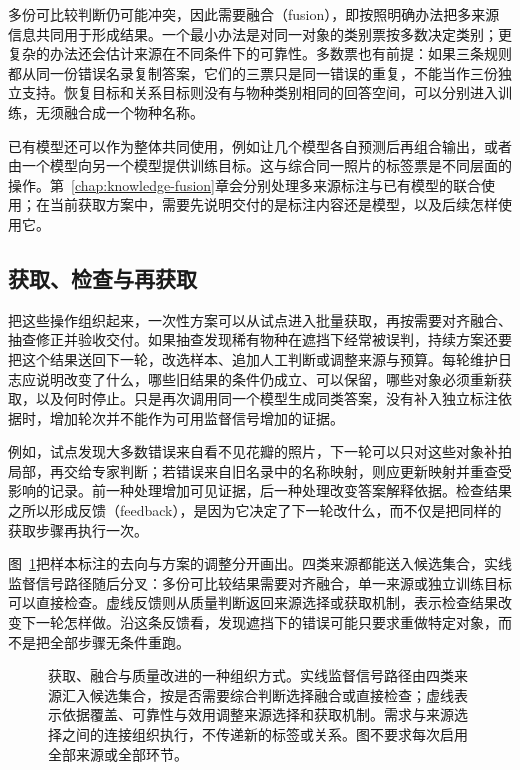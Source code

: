 多份可比较判断仍可能冲突，因此需要融合（fusion），即按照明确办法把多来源信息共同用于形成结果。一个最小办法是对同一对象的类别票按多数决定类别；更复杂的办法还会估计来源在不同条件下的可靠性。多数票也有前提：如果三条规则都从同一份错误名录复制答案，它们的三票只是同一错误的重复，不能当作三份独立支持。恢复目标和关系目标则没有与物种类别相同的回答空间，可以分别进入训练，无须融合成一个物种名称。

已有模型还可以作为整体共同使用，例如让几个模型各自预测后再组合输出，或者由一个模型向另一个模型提供训练目标。这与综合同一照片的标签票是不同层面的操作。第~\ref{chap:knowledge-fusion}章会分别处理多来源标注与已有模型的联合使用；在当前获取方案中，需要先说明交付的是标注内容还是模型，以及后续怎样使用它。

\subsection{获取、检查与再获取}
\label{sec:knowledge-acquisition-feedback}

把这些操作组织起来，一次性方案可以从试点进入批量获取，再按需要对齐融合、抽查修正并验收交付。如果抽查发现稀有物种在遮挡下经常被误判，持续方案还要把这个结果送回下一轮，改选样本、追加人工判断或调整来源与预算。每轮维护日志应说明改变了什么，哪些旧结果的条件仍成立、可以保留，哪些对象必须重新获取，以及何时停止。只是再次调用同一个模型生成同类答案，没有补入独立标注依据时，增加轮次并不能作为可用监督信号增加的证据。

例如，试点发现大多数错误来自看不见花瓣的照片，下一轮可以只对这些对象补拍局部，再交给专家判断；若错误来自旧名录中的名称映射，则应更新映射并重查受影响的记录。前一种处理增加可见证据，后一种处理改变答案解释依据。检查结果之所以形成反馈（feedback），是因为它决定了下一轮改什么，而不仅是把同样的获取步骤再执行一次。

图~\ref{fig:knowledge-acquisition-workflow}把样本标注的去向与方案的调整分开画出。四类来源都能送入候选集合，实线监督信号路径随后分叉：多份可比较结果需要对齐融合，单一来源或独立训练目标可以直接检查。虚线反馈则从质量判断返回来源选择或获取机制，表示检查结果改变下一轮怎样做。沿这条反馈看，发现遮挡下的错误可能只要求重做特定对象，而不是把全部步骤无条件重跑。

\begin{figure}[htbp]
  \centering
  
  \caption{获取、融合与质量改进的一种组织方式。实线监督信号路径由四类来源汇入候选集合，按是否需要综合判断选择融合或直接检查；虚线表示依据覆盖、可靠性与效用调整来源选择和获取机制。需求与来源选择之间的连接组织执行，不传递新的标签或关系。图不要求每次启用全部来源或全部环节。}
  \label{fig:knowledge-acquisition-workflow}
\end{figure}

